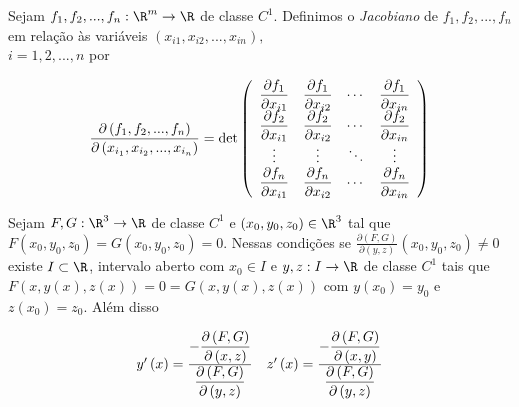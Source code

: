 \documentclass[11pt, oneside, a4paper]{gsm-l}
\begin{document}
\begin{defi}[Jacobiano]
Sejam $f_1 ,f_2 ,...,f_n :\R^m  \to \R$ de classe $C^1$. Definimos o \textit{Jacobiano} de $f_1 ,f_2 ,...,f_n$ em relação \`as variáveis $\left( {x_{i1 } ,x_{i2 } ,...,x_{in } } \right),$\\
$i = 1,2,...,n$ por

\[
\frac{{\partial \left( {f_1 ,f_2 ,...,f_n } \right)}}
{{\partial \left( {x_{i_1 } ,x_{i_2 } ,...,x_{i_n } } \right)}} = \det \left( {\begin{array}{*{20}c}
   \displaystyle {\frac{{\partial f_1 }}{{\partial x_{i1} }}} & \displaystyle {\frac{{\partial f_1 }}{{\partial x_{i2} }}} &  \cdots  & \displaystyle {\frac{{\partial f_1 }}{{\partial x_{in} }}}  \\
   \displaystyle {\frac{{\partial f_2 }}{{\partial x_{i1} }}} & \displaystyle {\frac{{\partial f_2 }}{{\partial x_{i2} }}} &  \cdots  & \displaystyle {\frac{{\partial f_2 }}{{\partial x_{in} }}}  \\
\vdots  &  \vdots  &  \ddots  &  \vdots   \\
   \displaystyle {\frac{{\partial f_n }}{{\partial x_{i1} }}} & \displaystyle {\frac{{\partial f_n }}{{\partial x_{i2} }}} &  \cdots  & \displaystyle {\frac{{\partial f_n }}{{\partial x_{in} }}}  \\

\end{array} } \right)
\]

\end{defi}

\begin{teo} \label{t4}
    Sejam $F,G:\R^3 \to \R$ de classe $C^1$ e $\left( {x_0 ,y_0 ,z_0 } \right) \in \R^3$ tal que $F\left( {x_0 ,y_0 ,z_0 } \right) = G\left( {x_0 ,y_0 ,z_0 } \right) = 0$. Nessas condições se $\frac{{\partial \left( {F,G} \right)}}
{{\partial \left( {y,z} \right)}}\left( {x_0 ,y_0 ,z_0 } \right) \ne 0$ existe $I \subset \R$, intervalo aberto com $x_0 \in I$ e $y,z: I \to \R$ de classe $C^1$ tais que $F\left( {x,y\left( x \right),z\left( x \right)} \right) = 0 = G\left( {x,y\left( x \right),z\left( x \right)} \right)$ com $y\left( {x_0 } \right) = y_0$ e $z\left( {x_0 } \right) = z_0$. Além disso

\[
\begin{array}{*{20}c}
   {y'\left( x \right) = \frac{{\displaystyle - \frac{{\partial \left( {F,G} \right)}}
{{\partial \left( {x,z} \right)}}}}
{{\displaystyle \frac{{\partial \left( {F,G} \right)}}
{{\partial \left( {y,z} \right)}}}}} & {z'\left( x \right) = \frac{{\displaystyle - \frac{{\partial \left( {F,G} \right)}}
{{\partial \left( {x,y} \right)}}}}
{{\displaystyle \frac{{\partial \left( {F,G} \right)}}
{{\partial \left( {y,z} \right)}}}}}  \\

\end{array}
\]

\end{teo}
\end{document}
